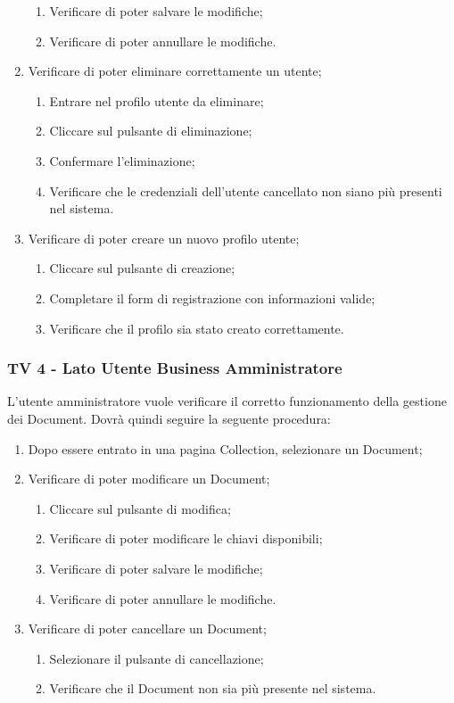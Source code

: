 \begin{enumerate}
\begin{enumerate}
\item Verificare di poter salvare le modifiche;
\item Verificare di poter annullare le modifiche.
\end{enumerate}
\item Verificare di poter eliminare correttamente un utente;
\begin{enumerate}
\item Entrare nel profilo utente da eliminare;
\item Cliccare sul pulsante di eliminazione;
\item Confermare l'eliminazione;
\item Verificare che le credenziali dell'utente cancellato non siano più presenti nel sistema.
\end{enumerate}
\item Verificare di poter creare un nuovo profilo utente;
\begin{enumerate}
\item Cliccare sul pulsante di creazione;
\item Completare il form di registrazione con informazioni valide;
\item Verificare che il profilo sia stato creato correttamente.
\end{enumerate}
\end{enumerate}


\subsubsection{TV 4 - Lato Utente Business Amministratore}

L’utente amministratore vuole verificare il corretto funzionamento della gestione dei Document.
Dovrà quindi seguire la seguente procedura:


\begin{enumerate}
\item Dopo essere entrato in una pagina Collection, selezionare un Document;
\item Verificare di poter modificare un Document;
\begin{enumerate}
\item Cliccare sul pulsante di modifica;
\item Verificare di poter modificare le chiavi disponibili;
\item Verificare di poter salvare le modifiche;
\item Verificare di poter annullare le modifiche.
\end{enumerate}
\item Verificare di poter cancellare un Document;
\begin{enumerate}
\item Selezionare il pulsante di cancellazione;
\item Verificare che il Document non sia più presente nel sistema.
\end{enumerate}
\end{enumerate}

